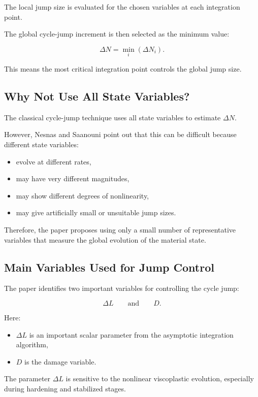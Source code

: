 ﻿\documentclass[11pt,a4paper]{article}
\begin{document}
The local jump size is evaluated for the chosen variables at each integration point.

The global cycle-jump increment is then selected as the minimum value:

\[
\Delta N
=
\min_i
\left(
\Delta N_i
\right).
\]

This means the most critical integration point controls the global jump size.

\subsection{Why Not Use All State Variables?}

The classical cycle-jump technique uses all state variables to estimate $\Delta N$.

However, Nesnas and Saanouni point out that this can be difficult because different state variables:

\begin{itemize}[leftmargin=*]
    \item evolve at different rates,
    \item may have very different magnitudes,
    \item may show different degrees of nonlinearity,
    \item may give artificially small or unsuitable jump sizes.
\end{itemize}

Therefore, the paper proposes using only a small number of representative variables that measure the global evolution of the material state.

\subsection{Main Variables Used for Jump Control}

The paper identifies two important variables for controlling the cycle jump:

\[
\Delta L
\qquad \text{and} \qquad
D.
\]

Here:

\begin{itemize}[leftmargin=*]
    \item $\Delta L$ is an important scalar parameter from the asymptotic integration algorithm,
    \item $D$ is the damage variable.
\end{itemize}

The parameter $\Delta L$ is sensitive to the nonlinear viscoplastic evolution, especially during hardening and stabilized stages.
\end{document}
